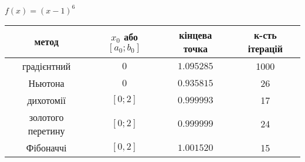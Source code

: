 \documentclass{extreport}
\begin{document}
\begin{center}
    $f(x) = (x-1)^6$

    
    \begin{tabular}{|c|c|c|c|}
    \hline
                    \bf метод & $x_0$ або $[a_0; b_0]$ &  \bf кінцева точка &  \bf к-сть ітерацій \\
                    \hline
              градієнтний &                    $0$ &    $1.095285$ &                   1000 \\
              \hline
                  Ньютона &                    $0$ &    $0.935815$ &                  26 \\
                  \hline
                дихотомії &              $[0; 2]$ &    $0.999993$ &                  17 \\
                \hline
        золотого перетину &              $[0; 2]$ &    $0.999999$ &                  24 \\
        \hline
                Фібоначчі &              $[0, 2]$ &    $1.001520$ &                  15 \\
                \hline
    \end{tabular}
\end{center}
\end{document}
